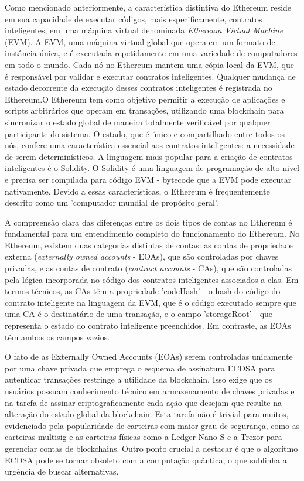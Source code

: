 \documentclass[12pt]{article}
\begin{document}
Como mencionado anteriormente, a característica distintiva do Ethereum reside em sua capacidade de
executar códigos, mais especificamente, contratos inteligentes, em uma máquina virtual denominada
\textit{Ethereum Virtual Machine} (EVM). A EVM, uma máquina virtual global que opera em um formato
de instância única, e é executada repetidamente em uma variedade de computadores em todo o mundo.
Cada nó no Ethereum mantem uma cópia local da EVM, que é responsável por validar e executar
contratos inteligentes. Qualquer mudança de estado decorrente da execução desses contratos
inteligentes é registrada no Ethereum\cite{6}.O Ethereum tem como objetivo permitir a execução de
aplicações e scripts arbitrários que operam em transações, utilizando uma blockchain para
sincronizar o estado global de maneira totalmente verificável por qualquer participante do
sistema\cite{13}. O estado, que é único e compartilhado entre todos os nós, confere uma
característica essencial aos contratos inteligentes: a necessidade de serem determinísticos. A
linguagem mais popular para a criação de contratos inteligentes é o Solidity\cite{16}. O Solidity é
uma linguagem de programação de alto nivel e precisa ser compilada para código EVM - bytecode que a
EVM pode executar nativamente\cite{15}. Devido a essas características, o Ethereum é frequentemente
descrito como um 'computador mundial de propósito geral'\cite{6}.

A compreensão clara das diferenças entre os dois tipos de contas no Ethereum é fundamental para um
entendimento completo do funcionamento do Ethereum. No Ethereum, existem duas categorias distintas
de contas: as contas de propriedade externa (\textit{externally owned accounts} - EOAs), que são
controladas por chaves privadas, e as contas de contrato (\textit{contract accounts} - CAs), que
são controladas pela lógica incorporada no código dos contratos inteligentes associados a
elas\cite{3}. Em termos técnicos, as CAs têm a propriedade 'codeHash' - o hash do código do
contrato inteligente na linguagem da EVM, que é o código executado sempre que uma CA é o
destinatário de uma transação, e o campo 'storageRoot' - que representa o estado do contrato
inteligente preenchidos. Em contraste, as EOAs têm ambos os campos vazios\cite{15}.

O fato de as Externally Owned Accounts (EOAs) serem controladas unicamente por uma chave privada
que emprega o esquema de assinatura ECDSA\cite{17} para autenticar transações restringe a utilidade
da blockchain. Isso exige que os usuários possuam conhecimento técnico em armazenamento de chaves
privadas e na tarefa de assinar criptograficamente cada ação que desejam que resulte na alteração
do estado global da blockchain. Esta tarefa não é trivial para muitos, evidenciado pela
popularidade de carteiras com maior grau de segurança, como as carteiras multisig e as carteiras
físicas como a Ledger Nano S\cite{19} e a Trezor\cite{20} para gerenciar contas de blockchains.
Outro ponto crucial a destacar é que o algoritmo ECDSA pode se tornar obsoleto com a computação
quântica\cite{18}, o que sublinha a urgência de buscar alternativas.
\end{document}

